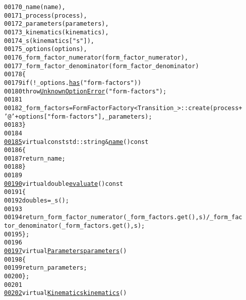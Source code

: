 \begin{footnotesize}
\begin{alltt}
00170                 \_name(name),
00171                 \_process(process),
00172                 \_parameters(parameters),
00173                 \_kinematics(kinematics),
00174                 \_s(kinematics[\textcolor{stringliteral}{"s"}]),
00175                 \_options(options),
00176                 \_form\_factor\_numerator(form\_factor\_numerator),
00177                 \_form\_factor\_denominator(form\_factor\_denominator)
00178             \{
00179                 \textcolor{keywordflow}{if} (! \_options.\hyperlink{classeos_1_1Options_a84ce27abf490cf39fa5a4d1cbb835c8e}{has}(\textcolor{stringliteral}{"form-factors"}))
00180                     \textcolor{keywordflow}{throw} \hyperlink{structeos_1_1UnknownOptionError}{UnknownOptionError}(\textcolor{stringliteral}{"form-factors"});
00181 
00182                 \_form\_factors = FormFactorFactory<Transition\_>::create(process + 
      \textcolor{charliteral}{'@'} + options[\textcolor{stringliteral}{"form-factors"}], \_parameters);
00183             \}
00184 
\hypertarget{form-factor-adapter_8hh_source_l00185}{}\hyperlink{classeos_1_1FormFactorRatioAdapter_a4794ed40d561e939e566f328d16652fe}{00185}             \textcolor{keyword}{virtual} \textcolor{keyword}{const} std::string & \hyperlink{classeos_1_1FormFactorRatioAdapter_a4794ed40d561e939e566f328d16652fe}{name}()\textcolor{keyword}{ const}
00186 \textcolor{keyword}{            }\{
00187                 \textcolor{keywordflow}{return} \_name;
00188             \}
00189 
\hypertarget{form-factor-adapter_8hh_source_l00190}{}\hyperlink{classeos_1_1FormFactorRatioAdapter_af0bed5942d9ba4b3c65788e1e05eaf8c}{00190}             \textcolor{keyword}{virtual} \textcolor{keywordtype}{double} \hyperlink{classeos_1_1FormFactorRatioAdapter_af0bed5942d9ba4b3c65788e1e05eaf8c}{evaluate}()\textcolor{keyword}{ const}
00191 \textcolor{keyword}{            }\{
00192                 \textcolor{keywordtype}{double} s = \_s();
00193 
00194                 \textcolor{keywordflow}{return} \_form\_factor\_numerator(\_form\_factors.get(), s) / \_form\_fac
      tor\_denominator(\_form\_factors.get(), s);
00195             \};
00196 
\hypertarget{form-factor-adapter_8hh_source_l00197}{}\hyperlink{classeos_1_1FormFactorRatioAdapter_a7146382f5bfc1c2b59119e844a6201a6}{00197}             \textcolor{keyword}{virtual} \hyperlink{classeos_1_1Parameters}{Parameters} \hyperlink{classeos_1_1FormFactorRatioAdapter_a7146382f5bfc1c2b59119e844a6201a6}{parameters}()
00198             \{
00199                 \textcolor{keywordflow}{return} \_parameters;
00200             \};
00201 
\hypertarget{form-factor-adapter_8hh_source_l00202}{}\hyperlink{classeos_1_1FormFactorRatioAdapter_a821bf6d21630dd75c8a25cd18f1cdd59}{00202}             \textcolor{keyword}{virtual} \hyperlink{classeos_1_1Kinematics}{Kinematics} \hyperlink{classeos_1_1FormFactorRatioAdapter_a821bf6d21630dd75c8a25cd18f1cdd59}{kinematics}()

\end{alltt}
\end{footnotesize}
